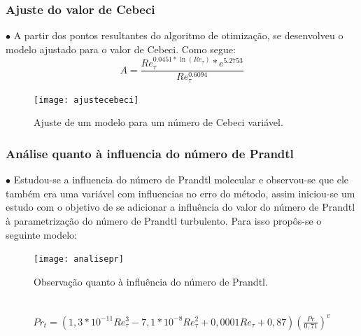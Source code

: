 \documentclass[xcolor=dvipsnames,10pt,aspectratio=169]{beamer}
\begin{document}
		
		
	
	
		\begin{frame}
		\frametitle{Ajuste do valor de Cebeci}
		\begin{minipage}[h!]{0.45\textwidth}
			$\bullet$ A partir dos pontos resultantes do algoritmo de otimização, se desenvolveu o modelo ajustado para o valor de Cebeci. Como segue:
			\begin{equation}
			A = \frac{Re_\tau ^{0.0451 * \ln(Re_\tau)} *e ^ {5.2753} }{Re_\tau ^{0.6094}}
			\end{equation}
		\end{minipage}\hfill
		\begin{minipage}[h!]{0.45\textwidth}
		\begin{figure}
			\centering
			\texttt{[image: ajustecebeci]}
			\caption{Ajuste de um modelo para um número de Cebeci variável.}
		\end{figure}
		\end{minipage}
		\end{frame}	

	
	
	
	
		\begin{frame}
		\frametitle{Análise quanto à influencia do número de Prandtl}
		\begin{minipage}[h!]{0.45\textwidth}
		$\bullet$ Estudou-se a influencia do número de Prandtl molecular e observou-se que ele também era uma variável com influencias no erro do método, assim iniciou-se um estudo com o objetivo de se adicionar a influência do valor do número de Prandtl à parametrização do número de Prandtl turbulento. Para isso propôs-se o seguinte modelo:
		\end{minipage}\hfill
		\begin{minipage}[h!]{0.45\textwidth}
		\begin{figure}
			\centering
			\texttt{[image: analisepr]}
			\caption{Observação quanto à influência do número de Prandtl.}
		\end{figure}
		\end{minipage}\\
		\begin{equation}
	\begin{split}
	Pr_t = \left( 1,3 * 10^{-11} Re_\tau^3 - 7,1 * 10^{-8} Re_\tau^2 + 0,0001 Re_\tau + 0,87 \right) \left(  \frac{Pr}{0,71}\right) ^{v}
	\end{split}
	\end{equation}
		\end{frame}
	
\end{document}
